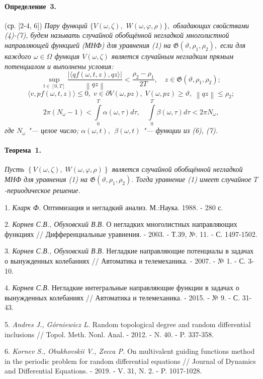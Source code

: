 \paragraph{Определение~3.} (ср. [2-4, 6])
{\it
Пару функций $\{ V(\omega,\zeta),$ \linebreak $W(\omega,\varphi,\rho ) \},$ обладающих свойствами (4)-(7),
будем называть случайной обобщённой негладкой многолистной на\-прав\-ляющей функцией (МНФ) для уравнения (1) на \linebreak $\mathfrak{G} \left({\vartheta ,\rho _{1} ,\rho _{2} } \right),$ если для каждого $\omega\in\Omega$ функция $V(\omega,\zeta)$ является случайным негладким прямым потенциалом и выполнены условия:
$$
 \mathop {\sup}\limits_{t \in \left[ {0,T} \right]}\frac{{\left| {\langle {qf(\omega, t, z),qz} \rangle} \right|}}{{\left\|{qz} \right\|}} < \frac{{\rho _{2} - \rho _{1} }}{{2T}},\quad z\in \mathfrak{G} (\vartheta ,\rho _{1} ,\rho _{2} );
$$
$$
\langle v, pf(\omega, t, z)\rangle \leq 0,\; v \in \partial V(\omega,pz),\; V(\omega,pz) \ge \vartheta ,\;\left\| {qz} \right\| \le \rho _{2};
$$
$$
2\pi (N_{\omega} - 1) < \int\limits_{0}^{T} {\alpha(\omega,\tau )d\tau } , \quad
\int\limits_{0}^{T} {\beta(\omega,\tau )d\tau < 2\pi N_{\omega}} ,
$$
где $N_{\omega}$ "--- целое число; $\alpha(\omega,t),\,\;\beta(\omega,t)$ "--- функции из (6), (7).
}

\paragraph{Теорема~1.}
{\it
Пусть $\left\{ {V(\omega,\zeta),\;W(\omega,\varphi,\rho )} \right\}$ является случайной обобщённой негладкой МНФ для уравнения (1) на \linebreak $\mathfrak{G} \left({\vartheta ,\rho _{1} ,\rho _{2} } \right).$ Тогда уравнение (1) имеет случайное $T$-пе\-риоди\-ческое ре\-ше\-ние.
}


\litlist

1. {\it Кларк Ф.}
Оптимизация и негладкий анализ. М.:Наука. 1988. - 280 с.

2. {\it Корнев С.В., Обуховский В.В.}
О негладких многолистных направляющих функциях // Дифференциальные уравнения. - 2003. - Т.39, №. 11. - С. 1497-1502.

3. {\it Корнев С.В., Обуховский В.В.}
Негладкие направляющие потенциалы в задачах о вынужденных колебаниях // Автоматика и телемеханика. - 2007. - № 1. - С. 3-10.

4. {\it Корнев С.В.}
Негладкие интегральные направляющие функции в задачах о вынужденных колебаниях // Автоматика и телемеханика. - 2015. - № 9. - С. 31-43.

5. {\it Andres J., G\'orniewicz L.}
Random topological degree and random differential inclusions // Topol. Meth. Nonl. Anal. - 2012. - N. 40. - P. 337-358.

6. {\it Kornev S., Obukhovskii V., Zecca P.}
On multivalent guiding functions method in the periodic problem for random differential equations // Journal of Dynamics and Differential Equations. - 2019. - V. 31, N. 2. - P. 1017-1028.
